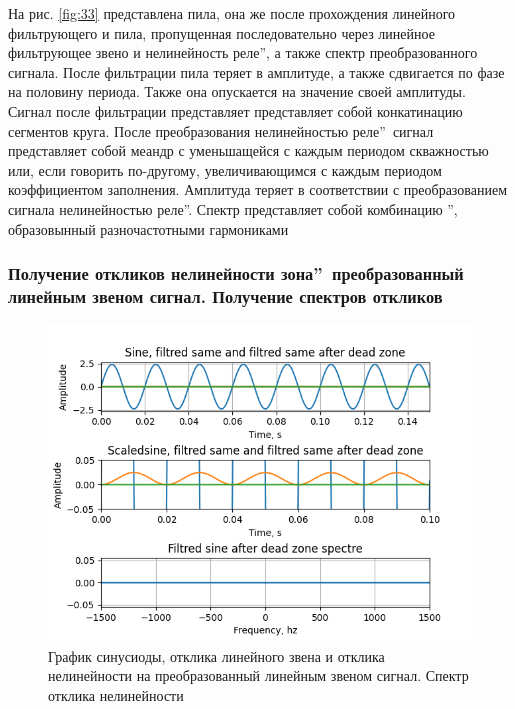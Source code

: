 На рис. \ref{fig:33} представлена пила, она же после прохождения
линейного фильтрующего и пила, пропущенная последовательно через линейное
фильтрующее звено и нелинейность  реле\textquotedblright,
а также спектр преобразованного сигнала. После фильтрации пила теряет в амплитуде,
а также сдвигается по фазе на половину периода. Также она опускается на значение
своей амплитуды. Сигнал после фильтрации представляет представляет собой
конкатинацию сегментов круга. После преобразования нелинейностью
 реле\textquotedblright\ сигнал представляет собой меандр
с уменьшащейся с каждым периодом скважностью или, если говорить по-другому, увеличивающимся
с каждым периодом коэффициентом заполнения. Амплитуда теряет в соответствии с
преобразованием сигнала нелинейностью  реле\textquotedblright.
Спектр представляет собой комбинацию \textquotedblright,
образовынный разночастотными гармониками

\subsubsection{Получение откликов нелинейности
 зона\textquotedblright\ преобразованный
линейным звеном сигнал. Получение спектров откликов}

\begin{figure}[H]
	\centering
	\includegraphics[width=1.05\linewidth]{body/images/filtred-sine-after-dead-zone-and-its-spectre.png}
	\caption{График синусиоды, отклика линейного звена и отклика нелинейности на преобразованный
	линейным звеном сигнал. Спектр отклика нелинейности}
	\label{fig:34}
\end{figure}

